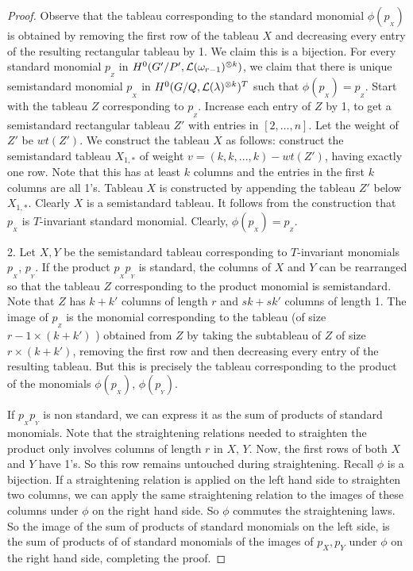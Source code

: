 \begin{proof}
    Observe that the tableau corresponding to the standard monomial \(\phi(p_{_X})\) is obtained by removing the first row of the tableau \(X\) and decreasing every entry of the resulting rectangular tableau by 1. We claim this is a bijection. For every standard monomial \(p_{_Z}\) in \(H^0(G'/P', {\cal L}(\omega_{r-1})^{\otimes k})\), we claim that there is unique semistandard monomial \(p_{_X}\) in \(H^0(G/Q,{\cal L}(\lambda)^{\otimes k})^T\) such that \(\phi(p_{_X})=p_{_Z}\). Start with the tableau $Z$ corresponding to  \(p_{_Z}\). Increase each entry of $Z$ by 1, to get a semistandard rectangular tableau $Z'$ with entries in $[2,\ldots,n]$. Let the weight of $Z'$ be $wt(Z')$.  We construct the tableau \(X\) as follows: construct the semistandard tableau \(X_{1,*}\) of weight \(v = (k,k,...,k) - wt(Z')\), having exactly one row. Note that this has at least $k$ columns and the entries in the first $k$ columns are all 1's. Tableau \(X\) is constructed by appending the tableau \(Z'\) below \(X_{1,*}\). Clearly $X$ is a semistandard tableau. It follows from the construction that \(p_{_X}\) is \(T\)-invariant standard monomial. Clearly, \(\phi(p_{_X}) = p_{_Z}\).

2. Let $X, Y$ be the semistandard tableau corresponding to $T$-invariant monomials $p_{_X}$, $p_{_Y}$.  If the product $p_{_X}p_{_Y}$ is standard, the columns of
$X$ and $Y$ can be rearranged so that the tableau $Z$ corresponding to the product monomial is semistandard. Note that $Z$ has $k+k'$ columns of
    length $r$ and $sk+sk'$ columns of length 1. The image of $p_{_Z}$ is the monomial corresponding to the tableau (of size $r-1 \times (k+k')$ ) obtained from $Z$ by taking the subtableau of $Z$ of size $r \times (k+k')$, removing the first row and then decreasing every entry of the resulting tableau. But this is precisely the tableau corresponding to the product of
the monomials $\phi(p_{_X})$, $\phi(p_{_Y})$.

If $p_{_X}p_{_Y}$ is non standard, we can express it as the sum of products of 
standard monomials. Note that the straightening relations needed to straighten the product only involves columns of length $r$ in $X$, $Y$. Now, the first rows of both $X$ and $Y$ have 1's. So this row remains untouched during straightening. Recall $\phi$ is a bijection. If a straightening relation is applied on the left hand side to straighten two columns, we can apply the same straightening relation to the images of these columns under $\phi$ on the right hand side. So $\phi$ commutes the straightening laws. So the image of the sum of products of standard monomials on the left side, is the sum of products of of standard monomials of the images of $p_{X},p_{Y}$ under $\phi$ on the right hand side, completing the proof.
\end{proof}
